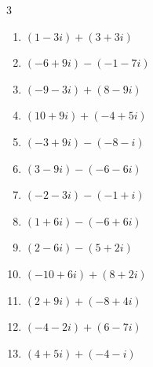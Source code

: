 \begin{multicols}{3}
\begin{enumerate}
        \phantom{$\displaystyle =9+11i$}

  \item $\displaystyle (1-3i) + (3+3i)$

        \phantom{$\displaystyle =4$}

  \item $\displaystyle (-6+9i) - (-1-7i)$

        \phantom{$\displaystyle =-5+16i$}

  \item $\displaystyle (-9-3i) + (8-9i)$

        \phantom{$\displaystyle =-1-12i$}

  \item $\displaystyle (10+9i) + (-4+5i)$

        \phantom{$\displaystyle =6+14i$}

  \item $\displaystyle (-3+9i) - (-8-i)$

        \phantom{$\displaystyle =5+10i$}

  \item $\displaystyle (3-9i) - (-6-6i)$

        \phantom{$\displaystyle =9-3i$}

\columnbreak %

  \item $\displaystyle (-2-3i) - (-1+i)$

        \phantom{$\displaystyle =-1-4i$}

  \item $\displaystyle (1+6i) - (-6+6i)$

        \phantom{$\displaystyle =7$}

  \item $\displaystyle (2-6i) - (5+2i)$

        \phantom{$\displaystyle =-3-8i$}

  \item $\displaystyle (-10+6i) + (8+2i)$

        \phantom{$\displaystyle =-2+8i$}

  \item $\displaystyle (2+9i) + (-8+4i)$

        \phantom{$\displaystyle =-6+13i$}

  \item $\displaystyle (-4-2i) + (6-7i)$

        \phantom{$\displaystyle =2-9i$}

  \item $\displaystyle (4+5i) + (-4-i)$


\end{enumerate}
\end{multicols}
